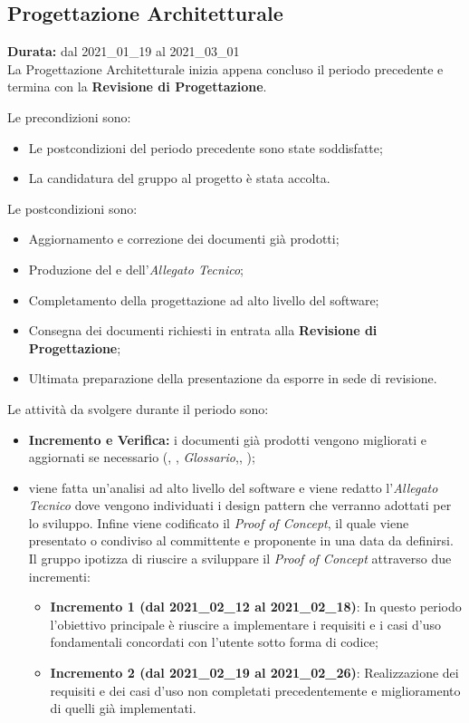 \subsection{Progettazione Architetturale}
\label{progettazione_architetturale}
\textbf{Durata:} dal 2021\_01\_19 al 2021\_03\_01\\
La Progettazione Architetturale inizia appena concluso il periodo precedente e termina con la \textbf{Revisione di Progettazione}.

Le precondizioni sono:
\begin{itemize}
    \item Le postcondizioni del periodo precedente sono state soddisfatte;
    \item La candidatura del gruppo al progetto {\NomeProgetto} è stata accolta.
\end{itemize}

Le postcondizioni sono:
\begin{itemize}
    \item Aggiornamento e correzione dei documenti già prodotti;
    \item Produzione del  e dell'\textit{Allegato Tecnico};
    \item Completamento della progettazione ad alto livello del software;
    \item Consegna dei documenti richiesti in entrata alla \textbf{Revisione di Progettazione};
    \item Ultimata preparazione della presentazione da esporre in sede di revisione.
\end{itemize}
Le attività da svolgere durante il periodo sono:
\begin{itemize}
    \item \textbf{Incremento e Verifica:} i documenti già prodotti vengono migliorati e aggiornati se necessario (\textit{\NdP}, \textit{\PdP}, \textit{Glossario},\textit{\PdQ}, \textit{\AdR});
    \item {} viene fatta un'analisi ad alto livello del software e viene redatto l'\textit{Allegato Tecnico} dove vengono individuati i design pattern che verranno adottati per lo sviluppo. Infine viene codificato il \textit{Proof of Concept}, il quale viene presentato o condiviso al committente e proponente in una data da definirsi. Il gruppo ipotizza di riuscire a sviluppare il {\textit{Proof of Concept}} attraverso due incrementi:
    \begin{itemize}
    	\item \textbf{Incremento 1 (dal 2021\_02\_12 al 2021\_02\_18)}: In questo periodo l'obiettivo principale è riuscire a implementare i requisiti e i casi d'uso fondamentali concordati con l'utente sotto forma di codice;
        \item \textbf{Incremento 2 (dal 2021\_02\_19 al 2021\_02\_26)}: Realizzazione dei requisiti e dei casi d'uso non completati precedentemente e miglioramento di quelli già implementati.
    \end{itemize}
\end{itemize}

